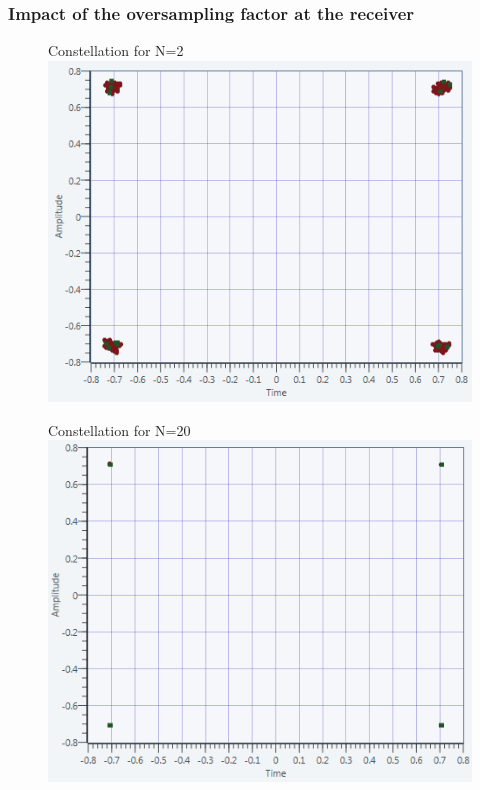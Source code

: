 \documentclass[11pt]{beamer}
\begin{document}
\begin{frame}
\frametitle{Impact of the oversampling factor at the receiver}

\begin{figure}
   \begin{minipage}[c]{.46\linewidth}
   \centering
   {\large Constellation for N=2}
            \tiny
      \includegraphics[width=1\textwidth]{img/ConstellationN2-MaxEnergy.png}
      
   \end{minipage} \hfill
   \begin{minipage}[c]{.46\linewidth}
   \centering
   {\large Constellation for N=20}
            \tiny
      \includegraphics[width=1\textwidth]{img/ConstellationN20-MaxEnergy.png}
   \end{minipage}
\end{figure}

\end{frame}
\end{document}
